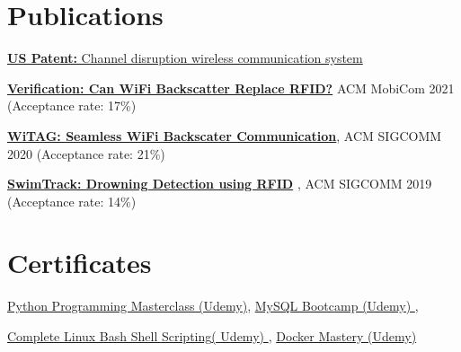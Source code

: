 \documentclass[letterpaper,12pt]{article}
\newcommand{\resumeSubHeadingListStart}{\begin{itemize}[leftmargin=*]}
\newcommand{\resumeSubHeadingListEnd}{\end{itemize}}
\begin{document}
\section{\color{Mahogany}Publications}
 \resumeSubHeadingListStart
 \item{\href{https://patentimages.storage.googleapis.com/a2/38/c3/7013ac293ff7c3/US20210288755A1.pdf}{\textbf{US Patent:} Channel disruption wireless communication system}}
 \vspace{-2mm}
 \item{\href{https://cs.uwaterloo.ca/~brecht/papers/wifi-vs-rfid-mobicom-2021.pdf}{\textbf{Verification: Can WiFi Backscatter Replace RFID?}}  \small{ACM MobiCom 2021 (Acceptance rate: 17\%)}
 \vspace{-2mm}
 \item{
    \href{http://web.cs.ucla.edu/~omid/Papers/Sigcomm20.pdf}{
        \textbf{WiTAG: Seamless WiFi Backscater Communication}}\small{, ACM SIGCOMM 2020 (Acceptance rate: 21\%)}
    }
 \vspace{-2mm}  
 \item{
    \href{https://www.researchgate.net/profile/Farzan-Dehbashi/publication/335186643_SwimTrack_Drowning_Detection_using_RFID/links/5ee0fa8f299bf13a8910118f/SwimTrack-Drowning-Detection-using-RFID.pdf}{
        \textbf{SwimTrack: Drowning Detection using RFID}} \small{, ACM SIGCOMM 2019 (Acceptance rate:  14\%)}
    }
 }
  \resumeSubHeadingListEnd
 
\vspace{-8mm}
\section{\color{Mahogany}Certificates}
\href{https://github.com/farzan-dehbashi/web_page/blob/main/certificates/python.pdf}{Python Programming Masterclass \footnotesize{(Udemy)}},
     \href{https://github.com/farzan-dehbashi/web_page/blob/main/certificates/SQL.pdf}{MySQL Bootcamp \footnotesize{(Udemy) }},
     
     \href{https://github.com/farzan-dehbashi/web_page/blob/main/certificates/bash.pdf}{Complete Linux Bash Shell Scripting\footnotesize{( Udemy)} },
     \href{https://github.com/farzan-dehbashi/web_page/blob/main/certificates/docker.pdf}{Docker Mastery \footnotesize{(Udemy)}
     }



\end{document}
